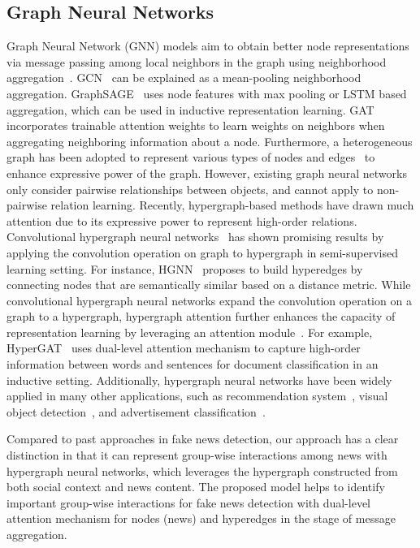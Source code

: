 \documentclass[conference]{IEEEtran}
\begin{document}
\subsection{Graph Neural Networks}
Graph Neural Network (GNN) models aim to obtain better node representations via message passing among local neighbors in the graph using neighborhood aggregation~\cite{ding2020graph,ding2022data}. GCN~\cite{kipf2016semi} can be explained as a mean-pooling neighborhood aggregation. GraphSAGE~\cite{hamilton2017inductive} uses node features with max pooling or LSTM based aggregation, which can be used in inductive representation learning. GAT~\cite{velivckovic2017graph} incorporates trainable attention weights to learn weights on neighbors when aggregating neighboring information about a node. Furthermore, a heterogeneous graph has been adopted to represent various types of nodes and  edges~\cite{wang2019heterogeneous} to enhance expressive power of the graph. However, existing graph neural networks only consider pairwise relationships between objects, and cannot apply to non-pairwise relation learning. Recently, hypergraph-based methods have drawn much attention due to its expressive power to represent high-order relations. Convolutional hypergraph neural networks~\cite{bai2021hypergraph} has shown promising results by applying the convolution operation on graph to hypergraph in semi-supervised learning setting. For instance, HGNN~\cite{feng2019hypergraph} proposes to build hyperedges by connecting nodes that are semantically similar based on a distance metric. While convolutional hypergraph neural networks expand the convolution operation on a graph to a hypergraph, hypergraph attention further enhances the capacity of representation learning by leveraging an attention module~\cite{bai2021hypergraph}. For example, HyperGAT~\cite{ding2020more} uses dual-level attention mechanism to capture high-order information between words and sentences for document classification in an inductive setting. Additionally, hypergraph neural networks have been widely applied in many other applications, such as recommendation system~\cite{wang2020next, wang2021session}, visual object detection~\cite{feng2019hypergraph}, and advertisement classification~\cite{jeong2022classifying}.




Compared to past approaches in fake news detection, our approach has a clear distinction in that it can represent group-wise interactions among news with hypergraph neural networks, which leverages the hypergraph constructed from both social context and news content. The proposed model helps to identify important group-wise interactions for fake news detection with dual-level attention mechanism for nodes (news) and hyperedges in the stage of message aggregation.
\end{document}
